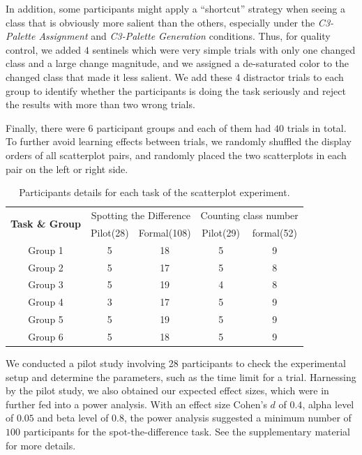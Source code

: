 In addition, some participants might apply a ``shortcut'' strategy when seeing a class that is obviously more salient than the others, especially under the \emph{C3-Palette Assignment} and \emph{C3-Palette Generation} conditions. Thus, for quality control, we added $4$ sentinels which were very simple trials with only one changed class and a large change magnitude, and we assigned a de-saturated color to the changed class that made it less salient. We add these 4 distractor trials to each group to identify whether the participants is doing the task seriously and reject the results with more than two wrong trials.

Finally, there were $6$ participant groups and each of them had $40$ trials in total. To further avoid learning effects between trials, we randomly shuffled the display orders of all scatterplot pairs, and randomly placed the two scatterplots in each pair on the left or right side.

\begin{table}[ht]
\renewcommand\arraystretch{1}
\centering
\caption{Participants details for each task of the scatterplot experiment.}
\label{tab:participantDetail}
\begin{tabular}{|c|c|c|c|c|}
\hline
\multirow{2}{*}{\textbf{Task \& Group}} & \multicolumn{2}{c|}{Spotting the Difference} & \multicolumn{2}{c|}{Counting class number} \\
\cline{2-5}
& Pilot(28) & Formal(108) & Pilot(29) & formal(52) \\
\hline
Group 1 & 5 & 18 & 5  & 9 \\
\hline
Group 2 & 5 & 17 & 5  & 8 \\
\hline
Group 3 & 5 & 19 & 4  & 8 \\
\hline
Group 4 & 3 & 17 & 5  & 9 \\
\hline
Group 5 & 5 & 19 & 5  & 9 \\
\hline
Group 6 & 5 & 18 & 5  & 9 \\
\hline
\end{tabular}
\end{table}


\vspace{.3em}
We conducted a pilot study involving 28 participants to check the experimental setup and determine the parameters, such as the time limit for a trial.
Harnessing by the pilot study, we also obtained our expected effect sizes, which were in further fed into a power analysis. With an effect size Cohen's $d$ of $0.4$, alpha level of $0.05$ and beta level of $0.8$, the power analysis suggested a minimum number of $100$ participants for the spot-the-difference task. See the supplementary material for more details.



